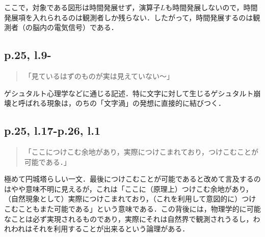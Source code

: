 \documentclass[10pt, a5paper, twoside]{jsarticle}
\theoremstyle{definition}
\begin{document}
                ここで，対象である図形は時間発展せず，演算子$L$も時間発展しないので，時間発展項を入れられるのは観測者しか残らない．したがって，時間発展するのは観測者（の脳内の電気信号）である．

            \subsection{p.25, l.9-}

                \begin{quote}

                    「見ているはずのものが実は見えていない〜」

                \end{quote}

                ゲシュタルト心理学などに通じる記述．特に文字に対して生じるゲシュタルト崩壊と呼ばれる現象は，のちの「文字渦」の発想に直接的に結びつく．






            \subsection{p.25, l.17-p.26, l.1}

                \begin{quote}

                    「ここにつけこむ余地があり，実際につけこまれており，つけこむことが可能である．」

                \end{quote}

                極めて円城塔らしい一文．最後につけこむことが可能であると改めて言及するのはやや意味不明に見えるが，これは「ここに（原理上）つけこむ余地があり，（自然現象として）実際につけこまれており，（これを利用して意図的に）つけこむこともまた可能である」という意味である．この背後には，物理学的に可能なことは必ず実現されるものであり，実際にそれは自然界で観測されうるし，われわれはそれを利用することが出来るという論理がある．
\end{document}
